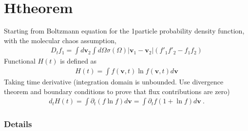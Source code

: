 \documentclass[letterpaper,10pt,english]{jupyterBook}
\begin{document}
\section{H\sphinxhyphen{}theorem}
\label{\detokenize{ch/statistical-mechanics/liouville-boltzmann:h-theorem}}
\sphinxAtStartPar
Starting from Boltzmann equation for the 1\sphinxhyphen{}particle probability density function, with the molecular chaos assumption,
\begin{equation*}
\begin{split}D_t f_1 = \int d \mathbf{v}_2 \int d\Omega \sigma(\Omega) |\mathbf{v}_1 - \mathbf{v}_2| \left( f'_1 f'_2 - f_1 f_2 \right)\end{split}
\end{equation*}
\sphinxAtStartPar
Functional \(H(t)\) is defined as
\begin{equation*}
\begin{split}H(t) = \int f(\mathbf{v},t) \ln f(\mathbf{v},t) d \mathbf{v}\end{split}
\end{equation*}
\sphinxAtStartPar
Taking time derivative (integration domain is unbounded. Use divergence theorem and boundary conditions to prove that flux contributions are zero)
\begin{equation*}
\begin{split}d_t H(t) = \int \partial_t \left( f \ln f \right) d \mathbf{v} = \int \partial_t f \left( 1 + \ln f \right) d \mathbf{v} \ .\end{split}
\end{equation*}\subsubsection*{Details}

\sphinxAtStartPar
{} 
\end{document}
